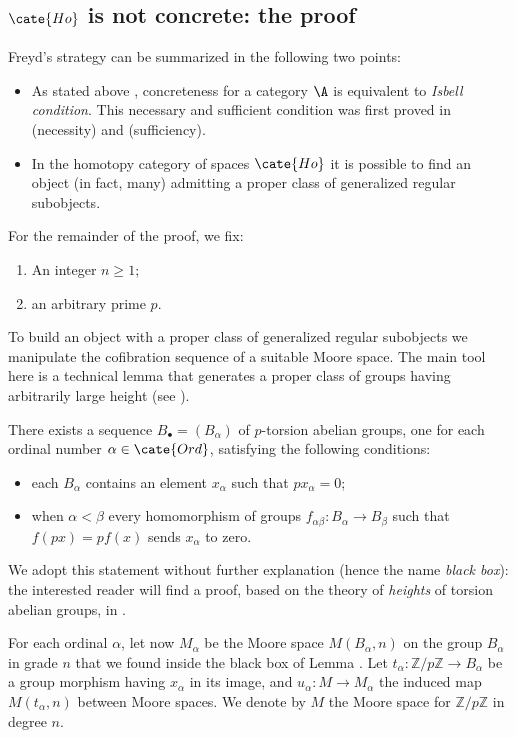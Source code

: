 \subsection{$\cate{Ho}$ is not concrete: the proof}
Freyd's strategy can be summarized in the following two points:
\begin{itemize}
	\item As stated above , concreteness for a category $\A$ is equivalent to \emph{Isbell condition}. This necessary and sufficient condition was first proved in \cite{Isbell1964} (necessity) and \cite{fconc} (sufficiency).
	\item In the homotopy category of spaces $\cate{Ho}$ it is possible to find an object (in fact, many) admitting a proper class of generalized regular subobjects.
\end{itemize}
For the remainder of the proof, we fix:
\begin{enumerate}
	\item An integer $n\ge 1$;
	\item an arbitrary prime $p$.
\end{enumerate}
To build an object with a proper class of generalized regular subobjects we manipulate the cofibration sequence of a suitable Moore space. The main tool here is a technical lemma that generates a proper class of groups having arbitrarily large height (see \cite{fuchs2015abelian}). 
\begin{lemma}\label{spastic}
There exists a sequence $B_\bullet = (B_\alpha)$ of $p$-torsion abelian groups, one for each ordinal number $\alpha\in\cate{Ord}$, satisfying the following conditions:
\begin{itemize}
	\item each $B_\alpha$ contains an element $x_\alpha$ such that $p x_\alpha = 0$;
	\item when $\alpha < \beta$ every homomorphism of groups $f_{\alpha\beta} \colon B_\alpha \to B_\beta$ such that $f(px)=p f(x)$ sends $x_\alpha$ to zero.
\end{itemize}
\end{lemma}
We adopt this statement without further explanation (hence the name \emph{black box}): the interested reader will find a proof, based on the theory of \emph{heights} of torsion abelian groups, in \cite{Freydconc}.
\begin{notat}
For each ordinal $\alpha$, let now $M_\alpha$ be the Moore space $M(B_\alpha,n)$ on the group $B_\alpha$  in grade $n$ that we found inside the black box of Lemma . Let $t_\alpha\colon \mathbb{Z}/p\mathbb{Z} \to B_\alpha$ be a group morphism having $x_\alpha$ in its image, and $u_\alpha\colon M \to M_\alpha$ the induced map $M(t_\alpha,n)$ between Moore spaces. We denote by $M$ the Moore space for $\mathbb{Z}/p\mathbb{Z}$ in degree $n$.
\end{notat}

